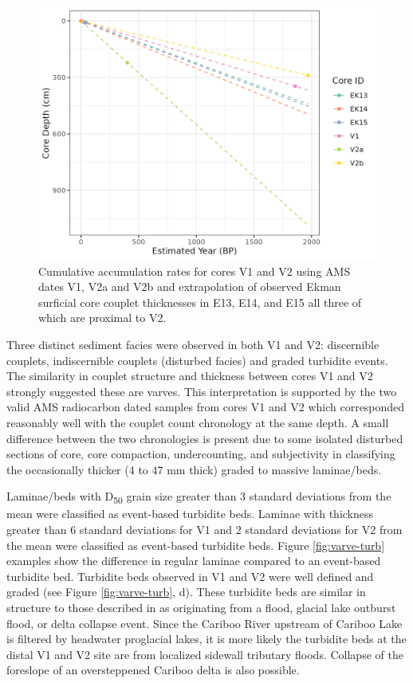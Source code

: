 \documentclass[Royal,times,doublespace,sageh]{sagej}
\begin{document}
\begin{figure}

{\centering \includegraphics[width=1\linewidth]{figs/sed_rates_V1_V2_ekmans} 

}

\caption{Cumulative accumulation rates for cores V1 and V2 using AMS dates V1, V2a and V2b and extrapolation of observed Ekman surficial core couplet thicknesses in E13, E14, and E15 all three of which are proximal to V2.\label{fig:amsRates}}\label{fig:amsRates}
\end{figure}

Three distinct sediment facies were observed in both V1 and V2:
discernible couplets, indiscernible couplets (disturbed facies) and
graded turbidite events. The similarity in couplet structure and
thickness between cores V1 and V2 strongly suggested these are varves.
This interpretation is supported by the two valid AMS radiocarbon dated
samples from cores V1 and V2 which corresponded reasonably well with the
couplet count chronology at the same depth. A small difference between
the two chronologies is present due to some isolated disturbed sections
of core, core compaction, undercounting, and subjectivity in classifying
the occasionally thicker (4 to 47 mm thick) graded to massive
laminae/beds.

Laminae/beds with D\textsubscript{50} grain size greater than 3 standard
deviations from the mean were classified as event-based turbidite beds.
Laminae with thickness greater than 6 standard deviations for V1 and 2
standard deviations for V2 from the mean were classified as event-based
turbidite beds. Figure \ref{fig:varve-turb} examples show the difference
in regular laminae compared to an event-based turbidite bed. Turbidite
beds observed in V1 and V2 were well defined and graded (see Figure
\ref{fig:varve-turb}, d). These turbidite beds are similar in structure
to those described in \citet{sabatier2022} as originating from a flood,
glacial lake outburst flood, or delta collapse event. Since the Cariboo
River upstream of Cariboo Lake is filtered by headwater proglacial
lakes, it is more likely the turbidite beds at the distal V1 and V2 site
are from localized sidewall tributary floods. Collapse of the foreslope
of an oversteppened Cariboo delta is also possible.
\end{document}
